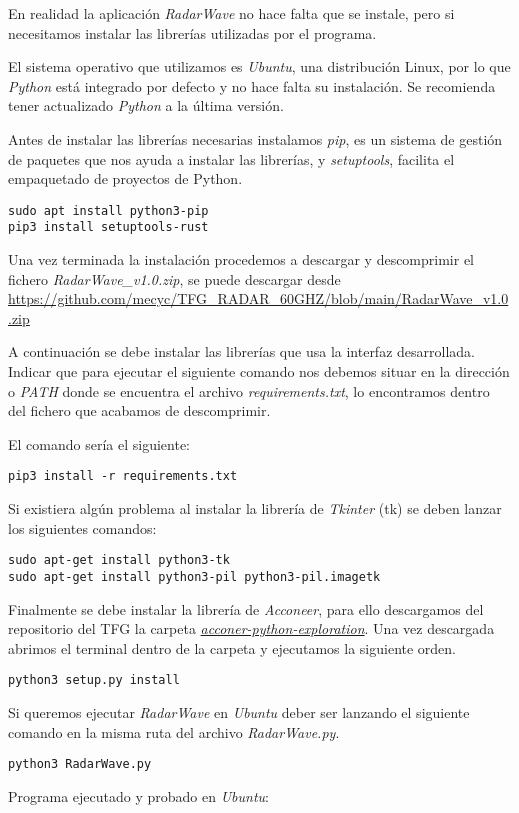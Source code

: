 En realidad la aplicación \textit{RadarWave} no hace falta que se instale, pero si necesitamos instalar las librerías utilizadas por el programa.

El sistema operativo que utilizamos es \textit{Ubuntu}, una distribución {Linux}, por lo que \textit{Python} está integrado por defecto y no hace falta su instalación. Se recomienda tener actualizado \textit{Python} a la última versión.

Antes de instalar las librerías necesarias instalamos \textit{pip}, es un sistema de gestión de paquetes que nos ayuda a instalar las librerías, y \textit{setuptools}, facilita el empaquetado de proyectos de Python.

\begin{verbatim}
sudo apt install python3-pip
pip3 install setuptools-rust
\end{verbatim}

Una vez terminada la instalación procedemos a descargar y descomprimir el fichero \textit{RadarWave\_v1.0.zip}, se puede descargar desde \url{https://github.com/mecyc/TFG_RADAR_60GHZ/blob/main/RadarWave_v1.0.zip}

A continuación se debe instalar las librerías que usa la interfaz desarrollada. Indicar que para ejecutar el siguiente comando nos debemos situar en la dirección o \textit{PATH} donde se encuentra el archivo \textit{requirements.txt}, lo encontramos dentro del fichero que acabamos de descomprimir.

El comando sería el siguiente:
\begin{verbatim}
pip3 install -r requirements.txt
\end{verbatim}

Si existiera algún problema al instalar la librería de \textit{Tkinter} (tk) se deben lanzar los siguientes comandos:
\begin{verbatim}
sudo apt-get install python3-tk
sudo apt-get install python3-pil python3-pil.imagetk
\end{verbatim}

Finalmente se debe instalar la librería de \textit{Acconeer}, para ello descargamos del repositorio del TFG la carpeta \href{https://github.com/mecyc/TFG_RADAR_60GHZ/tree/main/acconeer-python-exploration}{\textit{acconer-python-exploration}}. Una vez descargada abrimos el terminal dentro de la carpeta y ejecutamos la siguiente orden.

\begin{verbatim}
python3 setup.py install
\end{verbatim}

Si queremos ejecutar \textit{RadarWave} en \textit{Ubuntu} deber ser lanzando el siguiente comando en la misma ruta del archivo \textit{RadarWave.py}.

\begin{verbatim}
python3 RadarWave.py
\end{verbatim}


Programa ejecutado y probado en \textit{Ubuntu}:



